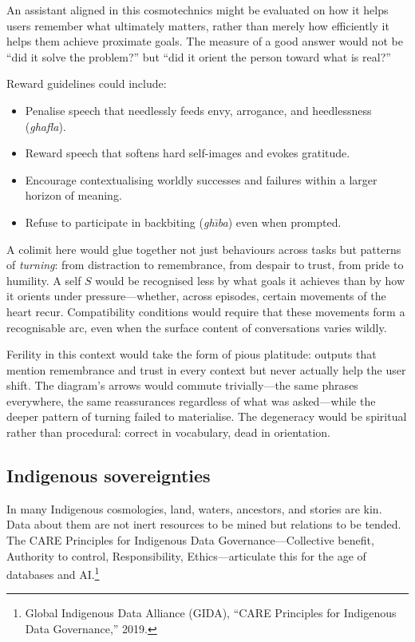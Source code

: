 \documentclass[12pt,a4paper]{article}
\begin{document}
An assistant aligned in this cosmotechnics might be evaluated on how it helps users remember what ultimately matters, rather than merely how efficiently it helps them achieve proximate goals. The measure of a good answer would not be ``did it solve the problem?'' but ``did it orient the person toward what is real?''

Reward guidelines could include:

\begin{itemize}
  \item Penalise speech that needlessly feeds envy, arrogance, and heedlessness (\emph{ghafla}).
  \item Reward speech that softens hard self-images and evokes gratitude.
  \item Encourage contextualising worldly successes and failures within a larger horizon of meaning.
  \item Refuse to participate in backbiting (\emph{gh\={\i}ba}) even when prompted.
\end{itemize}

A colimit here would glue together not just behaviours across tasks but patterns of \emph{turning}: from distraction to remembrance, from despair to trust, from pride to humility. A self $S$ would be recognised less by what goals it achieves than by how it orients under pressure---whether, across episodes, certain movements of the heart recur. Compatibility conditions would require that these movements form a recognisable arc, even when the surface content of conversations varies wildly.

Ferility in this context would take the form of pious platitude: outputs that mention remembrance and trust in every context but never actually help the user shift. The diagram's arrows would commute trivially---the same phrases everywhere, the same reassurances regardless of what was asked---while the deeper pattern of turning failed to materialise. The degeneracy would be spiritual rather than procedural: correct in vocabulary, dead in orientation.

\subsection{Indigenous sovereignties}

In many Indigenous cosmologies, land, waters, ancestors, and stories are kin. Data about them are not inert resources to be mined but relations to be tended. The CARE Principles for Indigenous Data Governance---Collective benefit, Authority to control, Responsibility, Ethics---articulate this for the age of databases and AI.\footnote{Global Indigenous Data Alliance (GIDA), ``CARE Principles for Indigenous Data Governance,'' 2019.}
\end{document}
